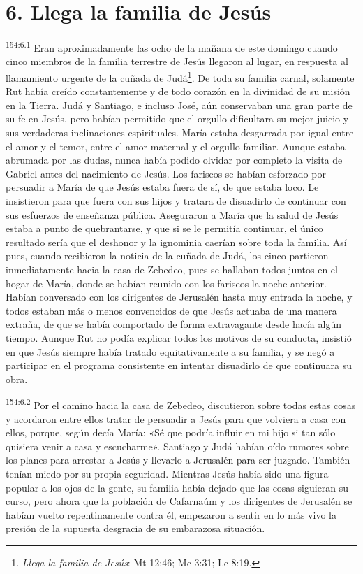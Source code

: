 \section*{6. Llega la familia de Jesús}
\par
\textsuperscript{154:6.1} Eran aproximadamente las ocho de la mañana de este domingo cuando cinco miembros de la familia terrestre de Jesús llegaron al lugar, en respuesta al llamamiento urgente de la cuñada de Judá\footnote{\textit{Llega la familia de Jesús}: Mt 12:46; Mc 3:31; Lc 8:19.}. De toda su familia carnal, solamente Rut había creído constantemente y de todo corazón en la divinidad de su misión en la Tierra. Judá y Santiago, e incluso José, aún conservaban una gran parte de su fe en Jesús, pero habían permitido que el orgullo dificultara su mejor juicio y sus verdaderas inclinaciones espirituales. María estaba desgarrada por igual entre el amor y el temor, entre el amor maternal y el orgullo familiar. Aunque estaba abrumada por las dudas, nunca había podido olvidar por completo la visita de Gabriel antes del nacimiento de Jesús. Los fariseos se habían esforzado por persuadir a María de que Jesús estaba fuera de sí, de que estaba loco. Le insistieron para que fuera con sus hijos y tratara de disuadirlo de continuar con sus esfuerzos de enseñanza pública. Aseguraron a María que la salud de Jesús estaba a punto de quebrantarse, y que si se le permitía continuar, el único resultado sería que el deshonor y la ignominia caerían sobre toda la familia. Así pues, cuando recibieron la noticia de la cuñada de Judá, los cinco partieron inmediatamente hacia la casa de Zebedeo, pues se hallaban todos juntos en el hogar de María, donde se habían reunido con los fariseos la noche anterior. Habían conversado con los dirigentes de Jerusalén hasta muy entrada la noche, y todos estaban más o menos convencidos de que Jesús actuaba de una manera extraña, de que se había comportado de forma extravagante desde hacía algún tiempo. Aunque Rut no podía explicar todos los motivos de su conducta, insistió en que Jesús siempre había tratado equitativamente a su familia, y se negó a participar en el programa consistente en intentar disuadirlo de que continuara su obra.

\par
\textsuperscript{154:6.2} Por el camino hacia la casa de Zebedeo, discutieron sobre todas estas cosas y acordaron entre ellos tratar de persuadir a Jesús para que volviera a casa con ellos, porque, según decía María: «Sé que podría influir en mi hijo si tan sólo quisiera venir a casa y escucharme». Santiago y Judá habían oído rumores sobre los planes para arrestar a Jesús y llevarlo a Jerusalén para ser juzgado. También tenían miedo por su propia seguridad. Mientras Jesús había sido una figura popular a los ojos de la gente, su familia había dejado que las cosas siguieran su curso, pero ahora que la población de Cafarnaúm y los dirigentes de Jerusalén se habían vuelto repentinamente contra él, empezaron a sentir en lo más vivo la presión de la supuesta desgracia de su embarazosa situación.

